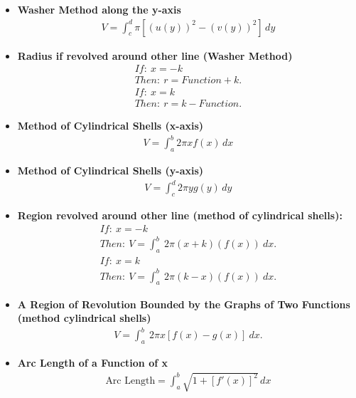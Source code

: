 \documentclass{report}
\begin{document}
\begin{itemize}
    \item \textbf{Washer Method along the y-axis}
    \begin{align}
        V = \int_{c}^{d} \pi [(u(y))^2 - (v(y))^2] \, dy
    \end{align}

    \item \textbf{Radius if revolved around other line (Washer Method)}
        \begin{align*}
           If:\ x=-k\\
           Then:\ r = Function + k
        .\end{align*}
        \begin{align*}
           If:\ x=k\\
           Then:\ r = k - Function
        .\end{align*}

    \item \textbf{Method of Cylindrical Shells (x-axis)}
    \begin{align}
        V = \int_{a}^{b} 2\pi x f(x) \, dx
    \end{align}

    \item \textbf{Method of Cylindrical Shells (y-axis)}
    \begin{align}
        V = \int_{c}^{d} 2\pi y g(y) \, dy
    \end{align}

    \item \textbf{Region revolved around other line (method of cylindrical shells):}
        \begin{align*}
            If:\ x=-k \\
            Then:\ V = \int_{a}^{b}\ 2\pi (x+k)(f(x))\ dx
        .\end{align*}
        \begin{align*}
             If:\ x=k \\
            Then:\ V = \int_{a}^{b}\ 2\pi (k-x)(f(x))\ dx
        .\end{align*}
    \item \textbf{A Region of Revolution Bounded by the Graphs of Two Functions (method cylindrical shells)}
        \begin{align*}
            V = \int_{a}^{b}\ 2\pi x\left[f(x)-g(x)\right]\ dx
        .\end{align*}

    \item \textbf{Arc Length of a Function of x}
    \begin{align}
        \text{Arc Length} = \int_{a}^{b} \sqrt{1 + [f'(x)]^2} \, dx
    \end{align}


\end{itemize}
\end{document}
